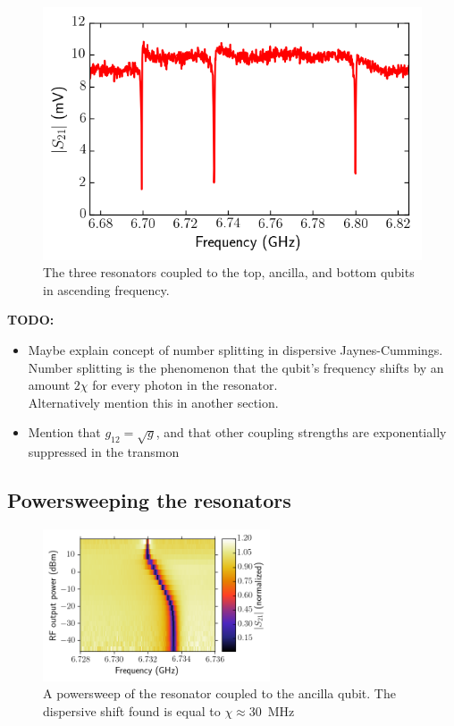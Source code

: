         \begin{figure}[tb]
          \centering
          \includegraphics[width=.7\textwidth]{../Figures/Qubit characterization/Resonator scans.png}
          \caption{The three resonators coupled to the top, ancilla, and bottom qubits in ascending frequency.}
          \label{fig:Three resonators}
        \end{figure}

        \textbf{TODO:}
        \begin{itemize}
          \item Maybe explain concept of number splitting in dispersive Jaynes-Cummings. Number splitting is the phenomenon that the qubit's frequency shifts by an amount $2 \chi$ for every photon in the resonator.\\
                Alternatively mention this in another section.
          \item Mention that $g_{12}=\sqrt{g}$, and that other coupling strengths are exponentially suppressed in the transmon
        \end{itemize}


      \subsection{Powersweeping the resonators}
        \label{ssec:powersweep}

        \begin{figure}[tb]
          \centering
          \includegraphics[width=0.6\textwidth]{../Figures/Qubit characterization/Powersweep.png}
          \caption{A powersweep of the resonator coupled to the ancilla qubit. The dispersive shift found is equal to $\chi\approx$\SI{30}{\mega \hertz}}
          \label{fig:powersweep}
        \end{figure}

